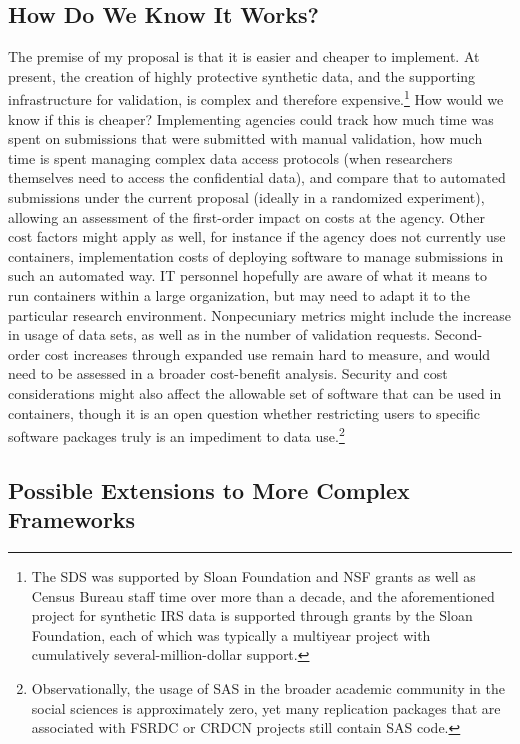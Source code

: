 \documentclass[inline]{hdsr}
\begin{document}
\subsection{How Do We Know It Works?}

The premise of my proposal is that it is easier and cheaper to implement. At present, the creation of highly protective synthetic data, and the supporting infrastructure for validation, is complex and therefore expensive.\footnote{The \ac{SDS} was supported by Sloan Foundation and \ac{NSF} grants as well as Census Bureau staff time over more than a decade, and the aforementioned project for synthetic IRS data is supported through grants by the Sloan Foundation, each of which was typically a multiyear project with cumulatively several-million-dollar support.} How would we know if this is cheaper? Implementing  agencies could track how much time was spent on submissions that were submitted with manual validation, how much time is spent managing complex data access protocols (when researchers themselves need to access the confidential data), and compare that to automated submissions under the current proposal (ideally in a randomized experiment), allowing an assessment of the first-order impact on costs at the agency. Other cost factors might apply as well, for instance if the agency does not currently use containers, implementation costs of deploying software to manage submissions in such an automated way. IT personnel hopefully are aware of what it means to run containers within a large organization, but may need to adapt it to the particular research environment.  Nonpecuniary metrics might include the increase in usage of data sets, as well as in the number of validation requests. Second-order cost increases through expanded use remain hard to measure, and would need to be assessed in a broader cost-benefit analysis. Security and cost considerations might also affect the allowable set of software that can be used in containers, though it is an open question whether restricting users to specific software packages truly is an impediment to data use.\footnote{Observationally, the usage of SAS in the broader academic community in the social sciences is approximately zero, yet many replication packages that are associated with \ac{FSRDC} or \ac{CRDCN} projects still contain SAS code.}

\subsection{Possible Extensions to More Complex Frameworks}
\end{document}
